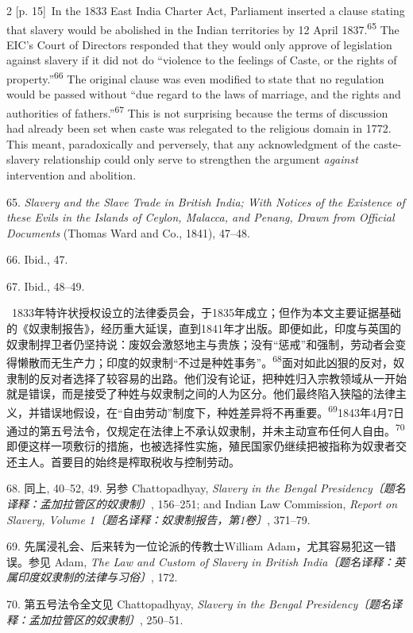 \documentclass[10pt,a4paper]{article}
\begin{document}
\begin{paracol}{2}
\switchcolumn
{\scriptsize\color{gray} [p. 15]}\ In the 1833 East India Charter Act, Parliament inserted a clause stating that slavery would be abolished in the Indian territories by 12 April 1837.\nobreak\textsuperscript{65} The EIC’s Court of Directors responded that they would only approve of legislation against slavery if it did not do “violence to the feelings of Caste, or the rights of property.”\nobreak\textsuperscript{66} The original clause was even modified to state that no regulation would be passed without “due regard to the laws of marriage, and the rights and authorities of fathers.”\nobreak\textsuperscript{67} This is not surprising because the terms of discussion had already been set when caste was relegated to the religious domain in 1772. This meant, paradoxically and perversely, that any acknowledgment of the caste-slavery relationship could only serve to strengthen the argument \textit{against} intervention and abolition.\par{\small 65. \textit{Slavery and the Slave Trade in British India; With Notices of the Existence of these Evils in the Islands of Ceylon, Malacca, and Penang, Drawn from Official Documents} (Thomas Ward and Co., 1841), 47–48.\par}{\small 66. Ibid., 47.\par}{\small 67. Ibid., 48–49.\par}
\switchcolumn*
{\scriptsize\color{gray} [p. 15]}\ 1833年特许状授权设立的法律委员会，于1835年成立；但作为本文主要证据基础的《奴隶制报告》，经历重大延误，直到1841年才出版。即便如此，印度与英国的奴隶制捍卫者仍坚持说：废奴会激怒地主与贵族；没有“惩戒”和强制，劳动者会变得懒散而无生产力；印度的奴隶制“不过是种姓事务”。\nobreak\textsuperscript{68}面对如此凶狠的反对，奴隶制的反对者选择了较容易的出路。他们没有论证，把种姓归入宗教领域从一开始就是错误，而是接受了种姓与奴隶制之间的人为区分。他们最终陷入狭隘的法律主义，并错误地假设，在“自由劳动”制度下，种姓差异将不再重\mbox{要。\textsuperscript{69}}1843年4月7日通过的第五号法令，仅规定在法律上不承认奴隶制，并未主动宣布任何人自\mbox{由。\textsuperscript{70}}即便这样一项敷衍的措施，也被选择性实施，殖民国家仍继续把被指称为奴隶者交还主人。首要目的始终是榨取税收与控制劳动。\par{\small 68. 同上, 40–52, 49. 另参 Chattopadhyay, \textit{Slavery in the Bengal Presidency〔题名译释：孟加拉管区的奴隶制〕}, 156–251; and Indian Law Commission, \textit{Report on Slavery, Volume 1〔题名译释：奴隶制报告，第1卷〕}, 371–79.\par}{\small 69. 先属浸礼会、后来转为一位论派的传教士William Adam，尤其容易犯这一错误。参见 Adam, \textit{The Law and Custom of Slavery in British India〔题名译释：英属印度奴隶制的法律与习俗〕}, 172.\par}{\small 70. 第五号法令全文见 Chattopadhyay, \textit{Slavery in the Bengal Presidency〔题名译释：孟加拉管区的奴隶制〕}, 250–51.\par}

\end{paracol}
\end{document}
